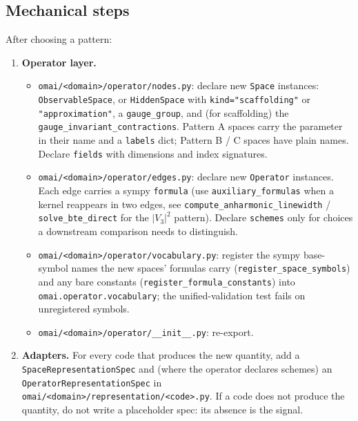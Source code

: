 \documentclass[11pt,a4paper]{article}
\begin{document}
\subsection{Mechanical steps}

After choosing a pattern:
\begin{enumerate}[leftmargin=2em]
  \item \textbf{Operator layer.}
    \begin{itemize}[leftmargin=1.5em]
      \item \texttt{omai/<domain>/operator/nodes.py}: declare new \texttt{Space}
            instances: \texttt{ObservableSpace}, or \texttt{HiddenSpace} with
            \texttt{kind="scaffolding"} or \texttt{"approximation"}, a
            \texttt{gauge\_group}, and (for scaffolding) the
            \texttt{gauge\_invariant\_contractions}. Pattern A spaces carry the
            parameter in their name and a \texttt{labels} dict; Pattern B / C spaces
            have plain names. Declare \texttt{fields} with dimensions and index
            signatures.
      \item \texttt{omai/<domain>/operator/edges.py}: declare new \texttt{Operator}
            instances. Each edge carries a sympy \texttt{formula} (use
            \texttt{auxiliary\_formulas} when a kernel reappears in two edges, see
            \texttt{compute\_anharmonic\_linewidth} / \texttt{solve\_bte\_direct} for
            the $|V_3|^2$ pattern). Declare \texttt{schemes} only for choices a
            downstream comparison needs to distinguish.
      \item \texttt{omai/<domain>/operator/vocabulary.py}: register the sympy
            base-symbol names the new spaces' formulas carry
            (\texttt{register\_space\_symbols}) and any bare constants
            (\texttt{register\_formula\_constants}) into
            \texttt{omai.operator.vocabulary}; the unified-validation test fails on
            unregistered symbols.
      \item \texttt{omai/<domain>/operator/\_\_init\_\_.py}: re-export.
    \end{itemize}
  \item \textbf{Adapters.} For every code that produces the new quantity, add a
        \texttt{SpaceRepresentationSpec} and (where the operator declares schemes) an
        \texttt{OperatorRepresentationSpec} in
        \texttt{omai/<domain>/}\allowbreak\texttt{representation/<code>.py}. If a code does not produce
        the quantity, do not write a placeholder spec: its absence is the signal.

\end{enumerate}
\end{document}
